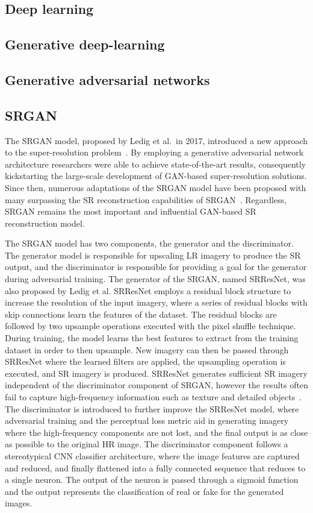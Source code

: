 \subsection{Deep learning}

\subsection{Generative deep-learning}

\subsection{Generative adversarial networks}

\subsection{SRGAN}
The SRGAN model, proposed by Ledig et al.\ in 2017, introduced a new approach to the super-resolution problem~\cite{srgan}. By employing a generative adversarial network architecture researchers were able to achieve state-of-the-art results, consequently kickstarting the large-scale development of GAN-based super-resolution solutions. Since then, numerous adaptations of the SRGAN model have been proposed with many surpassing the SR reconstruction capabilities of SRGAN~\cite{models}. Regardless, SRGAN remains the most important and influential GAN-based SR reconstruction model.

The SRGAN model has two components, the generator and the discriminator. The generator model is responsible for upscaling LR imagery to produce the SR output, and the discriminator is responsible for providing a goal for the generator during adversarial training. The generator of the SRGAN, named SRResNet, was also proposed by Ledig et al. SRResNet employs a residual block structure to increase the resolution of the input imagery, where a series of residual blocks with skip connections learn the features of the dataset. The residual blocks are followed by two upsample operations executed with the pixel shuffle technique. During training, the model learns the best features to extract from the training dataset in order to then upsample. New imagery can then be passed through SRResNet where the learned filters are applied, the upsampling operation is executed, and SR imagery is produced. SRResNet generates sufficient SR imagery independent of the discriminator component of SRGAN, however the results often fail to capture high-frequency information such as texture and detailed objects~\cite{srgan}. The discriminator is introduced to further improve the SRResNet model, where adversarial training and the perceptual loss metric aid in generating imagery where the high-frequency components are not lost, and the final output is as close as possible to the original HR image. The discriminator component follows a stereotypical CNN classifier architecture, where the image features are captured and reduced, and finally flattened into a fully connected sequence that reduces to a single neuron. The output of the neuron is passed through a sigmoid function and the output represents the classification of real or fake for the generated images.

